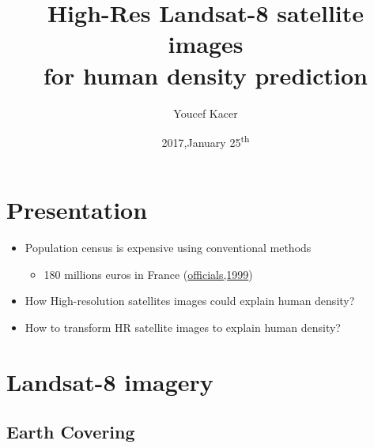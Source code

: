 \documentclass[c]{beamer}
\title[High-Res satellite images for human density prediction]{High-Res Landsat-8 satellite images \\for human density prediction}
\author{Youcef Kacer}
\institute{\href{http://www.github.com/ykacer/}{www.github.com/ykacer}}
\date{2017,January 25\textsuperscript{th}}
\begin{document}
\begin{frame}
\titlepage
{}
\end{frame}

\begin{frame}
\tableofcontents
\end{frame}

\section{Presentation}
\begin{frame}
\tableofcontents[currentsection]
\end{frame}

\begin{frame}
\begin{itemize}
\item Population census is expensive using conventional methods\\
  \begin{itemize}
  \item 180 millions euros in France (\href{http://www.assemblee-nationale.fr/13/rap-info/i1246.asp}{officials,1999})\\ 
  \end{itemize}
\item How High-resolution satellites images could explain human density?\\
\item How to transform HR satellite images to explain human density?\\
\end{itemize}
\end{frame}

\section{Landsat-8 imagery}

\subsection{Earth Covering}
\begin{frame}[label=Covering]
\tableofcontents[currentsubsection]
\end{frame}
\end{document}
